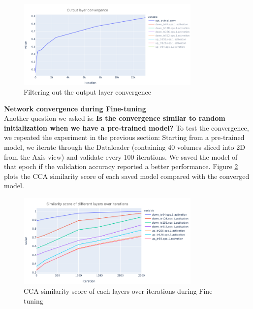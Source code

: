 \begin{figure}
	\centering
	\includegraphics[width=0.8\textwidth]{img/SVCCA/from_scratch_output_layer.png}
	\caption{Filtering out the output layer convergence}
	\label{fig:random_init_converge}
\end{figure}


\textbf{Network convergence during Fine-tuning}\\

Another question we asked is: \textbf{Is the convergence similar to random initialization when we have a pre-trained model?}
To test the convergence, we repeated the experiment in the previous section: Starting from a pre-trained model, we iterate through the Dataloader (containing 40 volumes sliced into 2D from the Axis view) and validate every 100 iterations. We saved the model of that epoch if the validation accuracy reported a better performance. Figure \ref{fig:transfer-convergence} plots the CCA similarity score of each saved model compared with the converged model.

\begin{figure}
	\centering
	\includegraphics[width=0.8\textwidth]{img/SVCCA/CCA_score_transfer_learning}
	\caption{CCA similarity score of each layers over iterations during Fine-tuning}
	\label{fig:transfer-convergence}
\end{figure}

